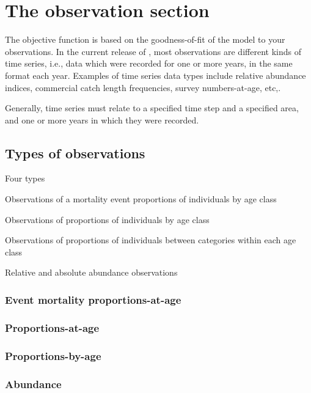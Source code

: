 \section{The observation section\label{sec:observation-section}}

The objective function is based on the goodness-of-fit of the model to your observations. In the current release of \SPM, most observations are different kinds of time series, i.e., data which were recorded for one or more years, in the same format each year. Examples of time series data types include relative abundance indices, commercial catch length frequencies, survey numbers-at-age, etc,. 

Generally, time series must relate to a specified time step and a specified area, and one or more years in which they were recorded.

\subsection{Types of observations}

Four types

\begin{description}
  \item Observations of a mortality event proportions of individuals by age class
  \item Observations of proportions of individuals by age class
  \item Observations of proportions of individuals between categories within each age class
  \item Relative and absolute abundance observations
\end{description}

\subsubsection{Event mortality proportions-at-age}

\subsubsection{Proportions-at-age}

\subsubsection{Proportions-by-age}

\subsubsection{Abundance}

